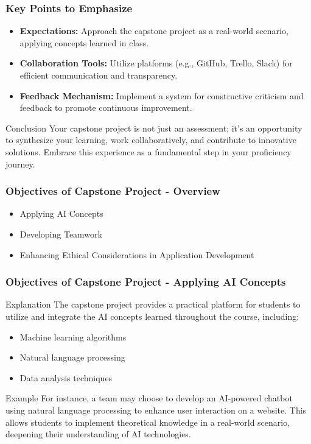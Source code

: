 \documentclass[aspectratio=169]{beamer}
\begin{document}
\begin{frame}[fragile]
    \frametitle{Key Points to Emphasize}
    \begin{itemize}
        \item \textbf{Expectations:} Approach the capstone project as a real-world scenario, applying concepts learned in class.
        \item \textbf{Collaboration Tools:} Utilize platforms (e.g., GitHub, Trello, Slack) for efficient communication and transparency.
        \item \textbf{Feedback Mechanism:} Implement a system for constructive criticism and feedback to promote continuous improvement.
    \end{itemize}

    \begin{block}{Conclusion}
        Your capstone project is not just an assessment; it’s an opportunity to synthesize your learning, work collaboratively, and contribute to innovative solutions. Embrace this experience as a fundamental step in your proficiency journey.
    \end{block}
\end{frame}

\begin{frame}[fragile]
    \frametitle{Objectives of Capstone Project - Overview}
    \begin{itemize}
        \item Applying AI Concepts
        \item Developing Teamwork
        \item Enhancing Ethical Considerations in Application Development
    \end{itemize}
\end{frame}

\begin{frame}[fragile]
    \frametitle{Objectives of Capstone Project - Applying AI Concepts}
    \begin{block}{Explanation}
        The capstone project provides a practical platform for students to utilize and integrate the AI concepts learned throughout the course, including:
        \begin{itemize}
            \item Machine learning algorithms
            \item Natural language processing
            \item Data analysis techniques
        \end{itemize}
    \end{block}
    \begin{block}{Example}
        For instance, a team may choose to develop an AI-powered chatbot using natural language processing to enhance user interaction on a website. This allows students to implement theoretical knowledge in a real-world scenario, deepening their understanding of AI technologies.
    \end{block}
\end{frame}
\end{document}
